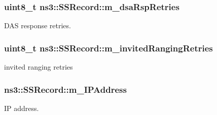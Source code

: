 \subsubsection[{\texorpdfstring{m\+\_\+dsa\+Rsp\+Retries}{m_dsaRspRetries}}]{\setlength{\rightskip}{0pt plus 5cm}uint8\+\_\+t ns3\+::\+S\+S\+Record\+::m\+\_\+dsa\+Rsp\+Retries\hspace{0.3cm}{\ttfamily [private]}}\hypertarget{classns3_1_1SSRecord_a6d56f78f489edd1627bd514f82249f03}{}\label{classns3_1_1SSRecord_a6d56f78f489edd1627bd514f82249f03}


D\+AS response retries. 

\subsubsection[{\texorpdfstring{m\+\_\+invited\+Ranging\+Retries}{m_invitedRangingRetries}}]{\setlength{\rightskip}{0pt plus 5cm}uint8\+\_\+t ns3\+::\+S\+S\+Record\+::m\+\_\+invited\+Ranging\+Retries\hspace{0.3cm}{\ttfamily [private]}}\hypertarget{classns3_1_1SSRecord_aa13808d81f2f4bd402e3bcb197f894c4}{}\label{classns3_1_1SSRecord_aa13808d81f2f4bd402e3bcb197f894c4}


invited ranging retries 

\subsubsection[{\texorpdfstring{m\+\_\+\+I\+P\+Address}{m_IPAddress}}]{ ns3\+::\+S\+S\+Record\+::m\+\_\+\+I\+P\+Address\hspace{0.3cm}{\ttfamily [private]}}\hypertarget{classns3_1_1SSRecord_a0ff0f392bf573003497d900d3fac0185}{}\label{classns3_1_1SSRecord_a0ff0f392bf573003497d900d3fac0185}


IP address. 

